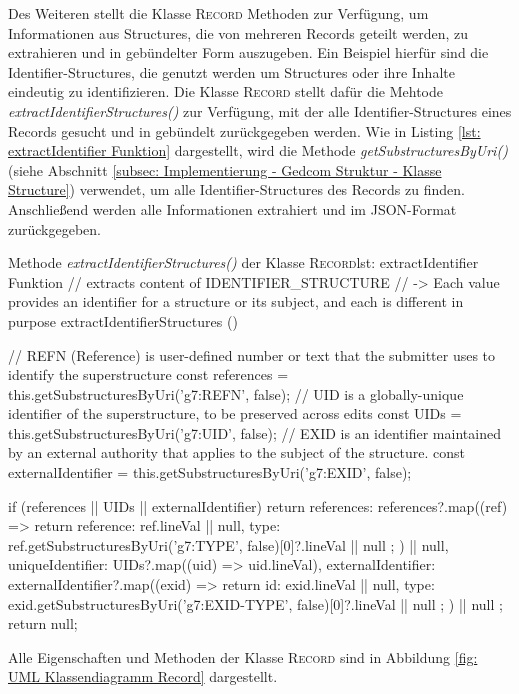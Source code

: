 Des Weiteren stellt die Klasse \textsc{Record} Methoden zur Verfügung, um Informationen aus Structures, die von mehreren Records geteilt werden, zu extrahieren und in gebündelter Form auszugeben. Ein Beispiel hierfür sind die Identifier-Structures, die genutzt werden um Structures oder ihre Inhalte eindeutig zu identifizieren. Die Klasse \textsc{Record} stellt dafür die Mehtode \textit{extractIdentifierStructures()} zur Verfügung, mit der alle Identifier-Structures eines Records gesucht und in gebündelt zurückgegeben werden. Wie in Listing \ref{lst: extractIdentifier Funktion} dargestellt, wird die Methode \textit{getSubstructuresByUri()} (siehe Abschnitt \ref{subsec: Implementierung - Gedcom Struktur - Klasse Structure}) verwendet, um alle Identifier-Structures des Records zu finden. Anschließend werden alle Informationen extrahiert und im JSON-Format zurückgegeben. 
\vspace{1em}
\begin{javascript}{Methode \textit{extractIdentifierStructures()} der Klasse \textsc{Record}}{lst: extractIdentifier Funktion}
	// extracts content of IDENTIFIER_STRUCTURE
	//  -> Each value provides an identifier for a structure or its subject, and each is different in purpose
	extractIdentifierStructures () {
		// REFN (Reference) is user-defined number or text that the submitter uses to identify the superstructure
		const references = this.getSubstructuresByUri('g7:REFN', false);
		// UID is a globally-unique identifier of the superstructure, to be preserved across edits
		const UIDs = this.getSubstructuresByUri('g7:UID', false);
		// EXID is an identifier maintained by an external authority that applies to the subject of the structure.
		const externalIdentifier = this.getSubstructuresByUri('g7:EXID', false);
		
		if (references || UIDs || externalIdentifier) {
			return {
				references: references?.map((ref) => {
					return {
						reference: ref.lineVal || null,
						type: ref.getSubstructuresByUri('g7:TYPE', false)[0]?.lineVal || null
					};
				}) || null,
				uniqueIdentifier: UIDs?.map((uid) => uid.lineVal),
				externalIdentifier: externalIdentifier?.map((exid) => {
					return {
						id: exid.lineVal || null,
						type: exid.getSubstructuresByUri('g7:EXID-TYPE', false)[0]?.lineVal || null
					};
				}) || null
			};
		}
		return null;
	}	
\end{javascript}
\vspace{1em}
Alle Eigenschaften und Methoden der Klasse \textsc{Record} sind in Abbildung \ref{fig: UML Klassendiagramm Record} dargestellt.
